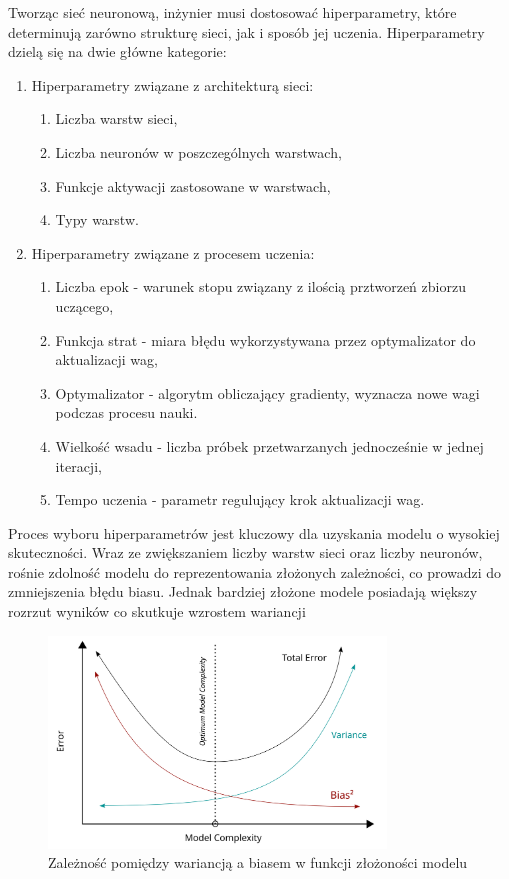 \documentclass[a4paper,twoside,12pt]{book}
\begin{document}
Tworząc sieć neuronową, inżynier musi dostosować hiperparametry, które determinują zarówno strukturę sieci, jak i sposób jej uczenia. Hiperparametry dzielą się na dwie główne kategorie: \begin{enumerate}
	\item Hiperparametry związane z architekturą sieci:
	      \begin{enumerate}
		      \item Liczba warstw sieci,
		      \item Liczba neuronów w poszczególnych warstwach,
		      \item Funkcje aktywacji zastosowane w warstwach,
		      \item Typy warstw.
	      \end{enumerate}
	      \newpage
	\item Hiperparametry związane z procesem uczenia:
	      \begin{enumerate}
		      \item Liczba epok - warunek stopu związany z ilością prztworzeń zbiorzu uczącego,
		      \item Funkcja strat - miara błędu wykorzystywana przez optymalizator do aktualizacji wag,
		      \item Optymalizator -  algorytm obliczający gradienty, wyznacza nowe wagi podczas procesu nauki.
		      \item Wielkość wsadu - liczba próbek przetwarzanych jednocześnie w jednej iteracji,
		      \item Tempo uczenia - parametr regulujący krok aktualizacji wag.
	      \end{enumerate}
\end{enumerate}

Proces wyboru hiperparametrów jest kluczowy dla uzyskania modelu o wysokiej skuteczności. Wraz ze zwiększaniem liczby warstw sieci oraz liczby neuronów, rośnie zdolność modelu do reprezentowania złożonych zależności, co prowadzi do zmniejszenia błędu biasu. Jednak bardziej złożone modele posiadają większy rozrzut wyników co skutkuje wzrostem wariancji

\begin{figure}[!h]
	\centering
	\includegraphics[width=0.8\textwidth]{img/r3/Bias_and_variance_tradeoff.png}
	\caption{Zależność pomiędzy wariancją a biasem w funkcji złożoności modelu\cite{bigbossfarin2021}}
	\label{bias-variance tradeoff}
\end{figure}
\end{document}
